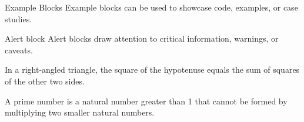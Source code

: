 \documentclass[aspectratio=169,xcolor=dvipsnames]{beamer}
\begin{document}
\begin{frame}{}

  \begin{exampleblock}{Example Blocks}
    Example blocks can be used to showcase code, examples, or case studies.
  \end{exampleblock}
  
  \begin{alertblock}{Alert block}
    Alert blocks draw attention to critical information, warnings, or caveats.
  \end{alertblock}
  
  \begin{theorem}
    In a right-angled triangle, the square of the hypotenuse equals the sum of squares of the other two sides.
  \end{theorem}
  
  \begin{definition}
    A prime number is a natural number greater than 1 that cannot be formed by multiplying two smaller natural numbers.
  \end{definition}
\end{frame}
\end{document}
